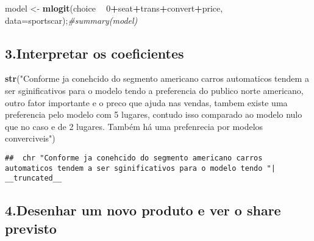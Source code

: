 \documentclass[]{article}
\newenvironment{Shaded}{\begin{snugshade}}{\end{snugshade}}
\newcommand{\CommentTok}[1]{\textcolor[rgb]{0.56,0.35,0.01}{\textit{#1}}}
\newcommand{\DataTypeTok}[1]{\textcolor[rgb]{0.13,0.29,0.53}{#1}}
\newcommand{\DecValTok}[1]{\textcolor[rgb]{0.00,0.00,0.81}{#1}}
\newcommand{\KeywordTok}[1]{\textcolor[rgb]{0.13,0.29,0.53}{\textbf{#1}}}
\newcommand{\NormalTok}[1]{#1}
\newcommand{\OperatorTok}[1]{\textcolor[rgb]{0.81,0.36,0.00}{\textbf{#1}}}
\newcommand{\StringTok}[1]{\textcolor[rgb]{0.31,0.60,0.02}{#1}}
\begin{document}
\begin{Shaded}
\begin{Highlighting}[]
\NormalTok{model <-}\StringTok{ }\KeywordTok{mlogit}\NormalTok{(choice }\OperatorTok{~}\StringTok{ }\DecValTok{0}\OperatorTok{+}\NormalTok{seat}\OperatorTok{+}\NormalTok{trans}\OperatorTok{+}\NormalTok{convert}\OperatorTok{+}\NormalTok{price, }\DataTypeTok{data=}\NormalTok{sportscar);}\CommentTok{#summary(model)}
\end{Highlighting}
\end{Shaded}

\hypertarget{interpretar-os-coeficientes}{%
\subsection{3.Interpretar os
coeficientes}\label{interpretar-os-coeficientes}}

\begin{Shaded}
\begin{Highlighting}[]
\KeywordTok{str}\NormalTok{(}\StringTok{"Conforme ja conehcido do segmento americano carros automaticos tendem a ser sginificativos para o modelo tendo a preferencia do publico norte americano, outro fator importante e o preco que ajuda nas vendas, tambem existe uma preferencia pelo modelo com 5 lugares, contudo isso comparado ao modelo nulo que no caso e de 2 lugares. Também há uma prefenrecia por modelos converciveis"}\NormalTok{)}
\end{Highlighting}
\end{Shaded}

\begin{verbatim}
##  chr "Conforme ja conehcido do segmento americano carros automaticos tendem a ser sginificativos para o modelo tendo "| __truncated__
\end{verbatim}

\hypertarget{desenhar-um-novo-produto-e-ver-o-share-previsto}{%
\subsection{4.Desenhar um novo produto e ver o share
previsto}\label{desenhar-um-novo-produto-e-ver-o-share-previsto}}
\end{document}
